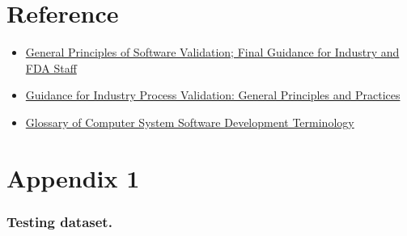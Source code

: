 \documentclass[12pt,a4paper]{article}
\begin{document}
\section{Reference}
\begin{itemize}
\item \href{https://www.fda.gov/media/73141/download}{General Principles of Software Validation; Final Guidance for Industry and FDA Staff}


\item \href{https://www.fda.gov/files/drugs/published/Process-Validation--General-Principles-and-Practices.pdf}{Guidance for Industry Process Validation: General Principles and Practices}


\item \href{https://www.fda.gov/inspections-compliance-enforcement-and-criminal-investigations/inspection-guides/glossary-computer-system-software-development-terminology-895}{Glossary of Computer System Software Development Terminology}

\end{itemize}
\section{Appendix 1}
\subsubsection{Testing dataset.}
\end{document}
